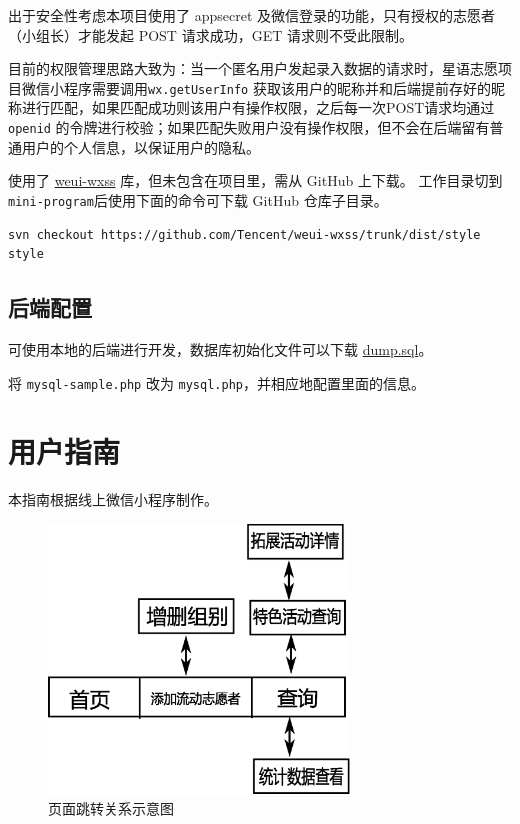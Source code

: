 \documentclass[]{ctexart}
\begin{document}
出于安全性考虑本项目使用了 appsecret
及微信登录的功能，只有授权的志愿者（小组长）才能发起 POST 请求成功，GET
请求则不受此限制。

目前的权限管理思路大致为：当一个匿名用户发起录入数据的请求时，星语志愿项目微信小程序需要调用\texttt{wx.getUserInfo}
获取该用户的昵称并和后端提前存好的昵称进行匹配，如果匹配成功则该用户有操作权限，之后每一次POST请求均通过
\texttt{openid}
的令牌进行校验；如果匹配失败用户没有操作权限，但不会在后端留有普通用户的个人信息，以保证用户的隐私。

使用了 \href{https://github.com/Tencent/weui-wxss}{weui-wxss}
库，但未包含在项目里，需从 GitHub 上下载。 工作目录切到
\texttt{mini-program}后使用下面的命令可下载 GitHub 仓库子目录。

\begin{lstlisting}[breaklines=true]
svn checkout https://github.com/Tencent/weui-wxss/trunk/dist/style style
\end{lstlisting}



\subsection{后端配置}\label{ux540eux7aefux914dux7f6e}

可使用本地的后端进行开发，数据库初始化文件可以下载
\href{https://www.leidenschaft.cn/xingyu/mysql_dump.sql}{dump.sql}。

将 \texttt{mysql-sample.php} 改为
\texttt{mysql.php}，并相应地配置里面的信息。

\section{用户指南}
本指南根据线上微信小程序制作。
\begin{figure}[!ht]
\centering
\includegraphics[width=8cm]{assets/pages.eps}
\caption{页面跳转关系示意图}\label{jump}
\end{figure}
\end{document}
